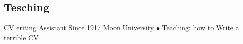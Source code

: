 \documentclass{article}
\begin{document}
\subsection{Tesching}
\begin{cvtable}[1.5]
	\customcvitem
                    {\faBriefcase}
                    {CV eriting Assistant}
                    {Since 1917}
                    {Moon University}
                    {
                    $\bullet$ Teaching: how to Write a terrible CV 
                        }
        
\end{cvtable}






\begin{cvtable}

\end{cvtable}

\cvsignature
\end{document}
